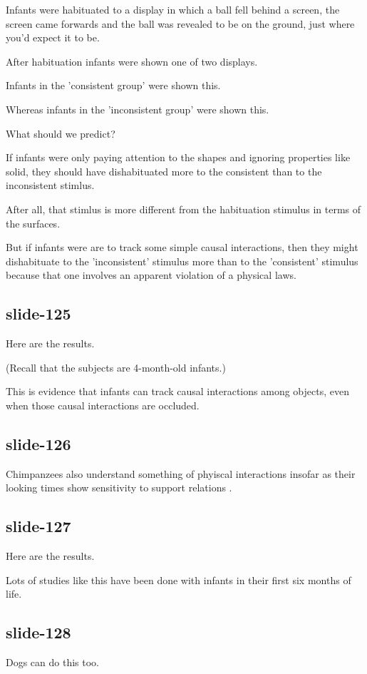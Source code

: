 \documentclass[12pt,\papersize]{extarticle}
\begin{document}
Infants were habituated to a display in which a ball fell behind a screen, the screen came forwards and the ball was revealed to be on the ground, just where you'd expect it to be.
 
After habituation infants were shown one of two displays.
 
Infants in the 'consistent group' were shown this.
 
Whereas infants in the 'inconsistent group' were shown this.
 
What should we predict?
 
If infants were only paying attention to the shapes and ignoring properties like solid, they should have dishabituated more to the consistent than to the inconsistent stimlus.
 
After all, that stimlus is more different from the habituation stimulus in terms of the surfaces.
 
But if infants were are to track some simple causal interactions, then they might dishabituate to the 'inconsistent' stimulus more than to the 'consistent' stimulus because that one involves an apparent violation of a physical laws.
 
\subsection{slide-125}
Here are the results.
 
(Recall that the subjects are 4-month-old infants.)
 
This is evidence that infants can track causal interactions among objects, even when those causal interactions are occluded.
 
\subsection{slide-126}
Chimpanzees also understand something of phyiscal interactions insofar as their looking times show sensitivity to support relations \citep{cacchione:2004_recognizing}.
 
\subsection{slide-127}
Here are the results.
 
Lots of studies like this have been done with infants in their first six months of life.
 
\subsection{slide-128}
Dogs can do this too.
 
\end{document}
